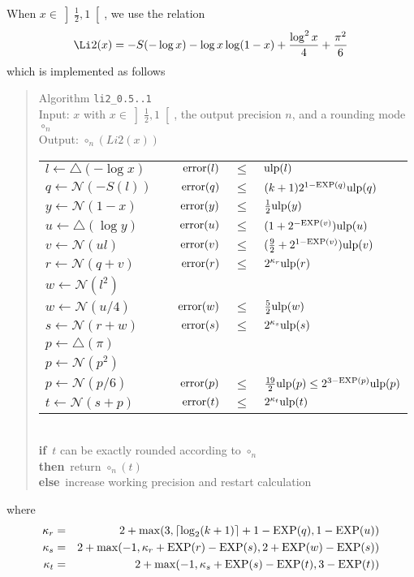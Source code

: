 \documentclass[12pt]{amsart}
\def\n{\textnormal}
\def\pinf{\bigtriangleup}
\def\ulp{{\rm ulp}}
\def\Exp{{\rm EXP}}
\def\N{{\mathcal N}}
\def\If{{\bf if}}
\def\then{{\bf then}}
\def\Else{{\bf else}}
\begin{document}
When $x \in \left]\frac{1}{2}, 1\right[$, we use the relation
\[
\Li2(x) = - S(-\log x) - \log x \log(1 - x) + \frac{\log^2 x}{4}
+ \frac{\pi^2}{6}
\]
which is implemented as follows
\begin{quote}
Algorithm {\tt li2\_0.5..1}\\
Input: $x$ with $x \in \left]\frac{1}{2}, 1\right[$, the output precision $n$,
    and a rounding mode $\circ_n$ \\
Output: $\circ_n(Li2(x))$ \\
\begin{tabular}{l c r c l}
$l \leftarrow \pinf(-\log x)$ & & $\n{error}(l) $ & $ \leq $ & $ \ulp(l)$\\
$q \leftarrow \N(-S(l))$ & &
$\n{error}(q) $ & $ \leq $ & $ (k+1)2^{1-\Exp(q)} \ulp(q)$\\

$y \leftarrow \N(1 - x)$ & &
$\n{error}(y) $ & $ \leq $ & $ \frac{1}{2}\ulp(y)$ \\
$u \leftarrow \pinf(\log y)$ & &
$\n{error}(u) $ & $ \leq $ & $(1 + 2^{-\Exp(v)}) \ulp(u)$\\
$v \leftarrow \N(ul)$ & &
$\n{error}(v) $ & $ \leq $ & $(\frac{9}{2} + 2^{1-\Exp(v)}) \ulp(v)$\\
$r \leftarrow \N(q + v)$ & &
$\n{error}(r) $ & $ \leq $ & $2^{\kappa_r}\ulp(r)$\\

$w \leftarrow \N(l^2)$\\
$w \leftarrow \N(u/4)$ & &
$\n{error}(w) $ & $ \leq $ & $ \frac{5}{2} \ulp(w)$\\
$s \leftarrow \N(r + w)$ & &
$\n{error}(s) $ & $ \leq $ & $2^{\kappa_s} \ulp(s)$ \\

$p \leftarrow \pinf(\pi)$ \\
$p \leftarrow \N(p^2)$ \\
$p \leftarrow \N(p/6)$ & &
$\n{error}(p) $ & $ \leq $ & $\frac{19}{2}\ulp(p) \leq 2^{3-\Exp(p)}\ulp(p)$\\
$t \leftarrow \N(s + p)$ & &
$\n{error}(t) $ & $ \leq $ & $2^{\kappa_t} \ulp(t)$
\end{tabular}\\
\If\ $t$ can be exactly rounded according to $\circ_n$\\
\then\ return $\circ_n(t)$\\
\Else\ increase working precision and restart calculation
\end{quote}
where 
\begin{eqnarray*}
\kappa_r & = & 2 + {\rm max}(3, \lceil\log_2(k+1)\rceil + 1 - \Exp(q),
1 - \Exp(u))\\
\kappa_s & = & 2 + {\rm max}(-1, \kappa_r + \Exp(r) - \Exp(s),
2 + \Exp(w) - \Exp(s))\\
\kappa_t & = & 2 + {\rm max}(-1, \kappa_s + \Exp(s) - \Exp(t),
3 - \Exp(t))
\end{eqnarray*}
\end{document}
